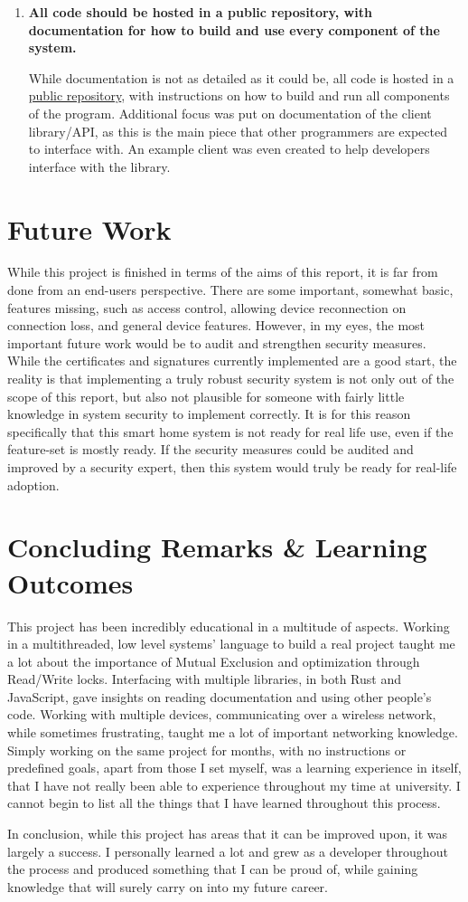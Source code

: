 \begin{enumerate}
    \item \textbf{All code should be hosted in a public repository, with documentation for how to build and use every component of the system.}

        While documentation is not as detailed as it could be, all code is hosted in a \href{https://github.com/niknik3610/IoT_Platform}{public repository}, with instructions on how to build and run all components of the program. Additional focus was put on documentation of the client library/API, as this is the main piece that other programmers are expected to interface with. An example client was even created to help developers interface with the library.
\end{enumerate}

\section{Future Work}
While this project is finished in terms of the aims of this report, it is far from done from an end-users perspective. There are some important, somewhat basic, features missing, such as access control, allowing device reconnection on connection loss, and general device features. However, in my eyes, the most important future work would be to audit and strengthen security measures. While the certificates and signatures currently implemented are a good start, the reality is that implementing a truly robust security system is not only out of the scope of this report, but also not plausible for someone with fairly little knowledge in system security to implement correctly. It is for this reason specifically that this smart home system is not ready for real life use, even if the feature-set is mostly ready. If the security measures could be audited and improved by a security expert, then this system would truly be ready for real-life adoption.

\section{Concluding Remarks \& Learning Outcomes}
This project has been incredibly educational in a multitude of aspects. Working in a multithreaded, low level systems' language to build a real project taught me a lot about the importance of Mutual Exclusion and optimization through Read/Write locks. Interfacing with multiple libraries, in both Rust and JavaScript, gave insights on reading documentation and using other people's code. Working with multiple devices, communicating over a wireless network, while sometimes frustrating, taught me a lot of important networking knowledge. Simply working on the same project for months, with no instructions or predefined goals, apart from those I set myself, was a learning experience in itself, that I have not really been able to experience throughout my time at university. I cannot begin to list all the things that I have learned throughout this process. 

In conclusion, while this project has areas that it can be improved upon, it was largely a success. I personally learned a lot and grew as a developer throughout the process and produced something that I can be proud of, while gaining knowledge that will surely carry on into my future career.
